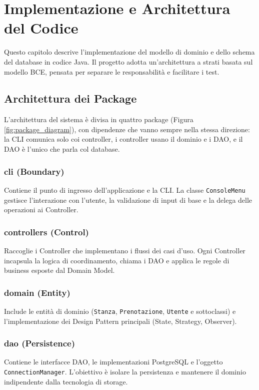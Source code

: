 \chapter{Implementazione e Architettura del Codice}

Questo capitolo descrive l'implementazione del modello di dominio e dello schema del database in codice Java. Il progetto adotta un'architettura a strati basata sul modello BCE, pensata per separare le responsabilità e facilitare i test.

\section{Architettura dei Package}

L'architettura del sistema è divisa in quattro package (Figura \ref{fig:package_diagram}), con dipendenze che vanno sempre nella stessa direzione: la CLI comunica solo coi controller, i controller usano il dominio e i DAO, e il DAO è l'unico che parla col database.

\subsection{cli (Boundary)}
Contiene il punto di ingresso dell'applicazione e la CLI. La classe \texttt{ConsoleMenu} gestisce l'interazione con l'utente, la validazione di input di base e la delega delle operazioni ai Controller.

\subsection{controllers (Control)}
Raccoglie i Controller che implementano i flussi dei casi d'uso. Ogni Controller incapsula la logica di coordinamento, chiama i DAO e applica le regole di business esposte dal Domain Model.

\subsection{domain (Entity)}
Include le entità di dominio (\texttt{Stanza}, \texttt{Prenotazione}, \texttt{Utente} e sottoclassi) e l'implementazione dei Design Pattern principali (State, Strategy, Observer).

\subsection{dao (Persistence)}
Contiene le interfacce DAO, le implementazioni PostgreSQL e l'oggetto \texttt{ConnectionManager}. L'obiettivo è isolare la persistenza e mantenere il dominio indipendente dalla tecnologia di storage.

